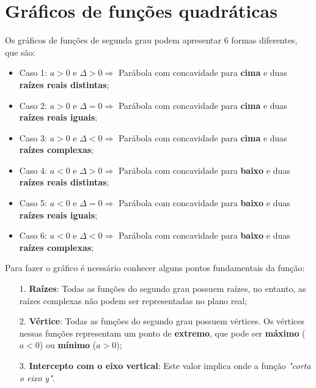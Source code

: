 \section{Gráficos de funções quadráticas}

Os gráficos de funções de segunda grau podem apresentar 6 formas diferentes, que são:

\begin{itemize}
	\item{Caso 1: $a > 0$ e $\Delta > 0 \Rightarrow$ Parábola com concavidade para \textbf{cima} e duas \textbf{raízes reais distintas};}
	\item{Caso 2: $a > 0$ e $\Delta = 0 \Rightarrow$ Parábola com concavidade para \textbf{cima} e duas \textbf{raízes reais iguais};}
	\item{Caso 3: $a > 0$ e $\Delta < 0 \Rightarrow$ Parábola com concavidade para \textbf{cima} e duas \textbf{raízes complexas};}
	\item{Caso 4: $a < 0$ e $\Delta > 0 \Rightarrow$ Parábola com concavidade para \textbf{baixo} e duas \textbf{raízes reais distintas};}
	\item{Caso 5: $a < 0$ e $\Delta = 0 \Rightarrow$ Parábola com concavidade para \textbf{baixo} e duas \textbf{raízes reais iguais};}
	\item{Caso 6: $a < 0$ e $\Delta < 0 \Rightarrow$ Parábola com concavidade para \textbf{baixo} e duas \textbf{raízes complexas};} \\
\end{itemize}

Para fazer o gráfico é ncessário conhecer alguns pontos fundamentais da função: \\

\begin{itemize}
	\item[1.]{\textbf{Raízes}: Todas as funções do segundo grau possuem raízes, no entanto, as raízes complexas não podem ser representadas no plano real;}
	\item[2.]{\textbf{Vértice}: Todas as funções do segundo grau possuem vértices. Os vértices nessas funções representam um ponto de \textbf{extremo}, que pode ser \textbf{máximo} ($a<0$) ou \textbf{mínimo} ($a>0$);}
	\item[3.]{\textbf{Intercepto com o eixo vertical}: Este valor implica onde a função \textit{"corta o eixo y"}.} \\
\end{itemize}

